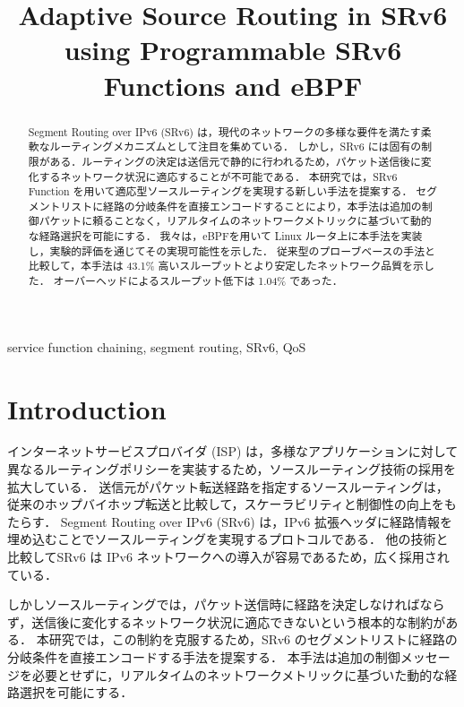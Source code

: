 \documentclass[conference]{IEEEtran}
\begin{document}
\title{Adaptive Source Routing in SRv6 using Programmable SRv6 Functions and eBPF}

\author{
}

\maketitle

\begin{abstract}
  Segment Routing over IPv6 (SRv6) は，現代のネットワークの多様な要件を満たす柔軟なルーティングメカニズムとして注目を集めている．
  しかし，SRv6 には固有の制限がある．ルーティングの決定は送信元で静的に行われるため，パケット送信後に変化するネットワーク状況に適応することが不可能である．
  本研究では，SRv6 Function を用いて適応型ソースルーティングを実現する新しい手法を提案する．
  セグメントリストに経路の分岐条件を直接エンコードすることにより，本手法は追加の制御パケットに頼ることなく，リアルタイムのネットワークメトリックに基づいて動的な経路選択を可能にする．
  我々は，eBPFを用いて Linux ルータ上に本手法を実装し，実験的評価を通じてその実現可能性を示した．
  従来型のプローブベースの手法と比較して，本手法は 43.1\% 高いスループットとより安定したネットワーク品質を示した．
  オーバーヘッドによるスループット低下は 1.04\% であった．
\end{abstract}

\begin{IEEEkeywords}
  service function chaining, segment routing, SRv6, QoS
\end{IEEEkeywords}

\section{Introduction}

インターネットサービスプロバイダ (ISP) は，多様なアプリケーションに対して異なるルーティングポリシーを実装するため，ソースルーティング技術の採用を拡大している\cite{cisco_rakuten_srv6}\cite{softbank_srv6}．
送信元がパケット転送経路を指定するソースルーティングは，従来のホップバイホップ転送と比較して，スケーラビリティと制御性の向上をもたらす．
Segment Routing over IPv6 (SRv6) は，IPv6 拡張ヘッダに経路情報を埋め込むことでソースルーティングを実現するプロトコルである．
他の技術と比較してSRv6 は IPv6 ネットワークへの導入が容易であるため，広く採用されている．

しかしソースルーティングでは，パケット送信時に経路を決定しなければならず，送信後に変化するネットワーク状況に適応できないという根本的な制約がある．
本研究では，この制約を克服するため，SRv6 のセグメントリストに経路の分岐条件を直接エンコードする手法を提案する．
本手法は追加の制御メッセージを必要とせずに，リアルタイムのネットワークメトリックに基づいた動的な経路選択を可能にする．
\end{document}
